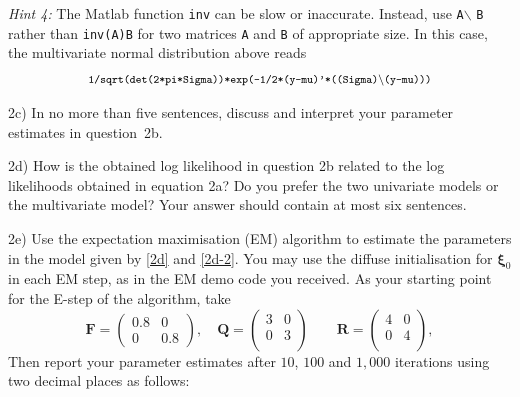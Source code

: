 \documentclass[12pt, a4paper]{article}
\newcommand{\FF}{\mathbf{F}}
\newcommand{\QQ}{\mathbf{Q}}
\newcommand{\RR}{\mathbf{R}}
\newcommand{\Xxi}{\boldsymbol{\xi}}
\begin{document}
\noindent \emph{Hint 4:} The Matlab function \texttt{inv} can be slow or inaccurate. Instead, use \texttt{A}$\backslash$ \texttt{B} rather than \texttt{inv(A)B} for two matrices \texttt{A} and \texttt{B} of appropriate size. In this case, the multivariate normal distribution above reads
\\
\begin{equation*}
\begin{array}{c}
\footnotesize\texttt{1/sqrt(det(2*pi*Sigma))*exp(-1/2*(y-mu)'*((Sigma)$\backslash$(y-mu)))} 
\end{array}
\end{equation*}

\medskip\noindent 2c) In no more than five sentences, discuss and interpret your parameter estimates in question~2b.

\medskip\noindent 2d) How is the obtained log likelihood in question 2b related to the log likelihoods obtained in equation 2a? Do you prefer the two univariate models or the multivariate model? Your answer should contain at most six sentences.

\medskip\noindent 2e) Use the expectation maximisation (EM) algorithm to estimate the parameters in the model given by \eqref{2d} and \eqref{2d-2}. You may use the diffuse initialisation for $\Xxi_0$ in each EM step, as in the EM demo code you received. As your starting point for the E-step of the algorithm, take
\[
\FF=\left(
\begin{array}{cc}
0.8 & 0 \\
0 & 0.8
\end{array}
\right),\quad
\QQ=\left(
\begin{array}{cc}
3 & 0 \\
0 & 3 \\
\end{array}
\right)\quad
\quad
\RR=\left(
\begin{array}{cc}
4 & 0 \\
0 & 4 \\
\end{array}
\right),
\]
Then report your parameter estimates after $10$, $100$ and $1,000$ iterations using two decimal places as follows:
\end{document}
